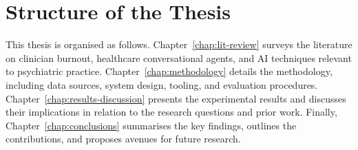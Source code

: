 \section{Structure of the Thesis}
This thesis is organised as follows. Chapter~\ref{chap:lit-review} surveys the literature on clinician burnout, healthcare conversational agents, and AI techniques relevant to psychiatric practice. Chapter~\ref{chap:methodology} details the methodology, including data sources, system design, tooling, and evaluation procedures. Chapter~\ref{chap:results-discussion} presents the experimental results and discusses their implications in relation to the research questions and prior work. Finally, Chapter~\ref{chap:conclusions} summarises the key findings, outlines the contributions, and proposes avenues for future research.

